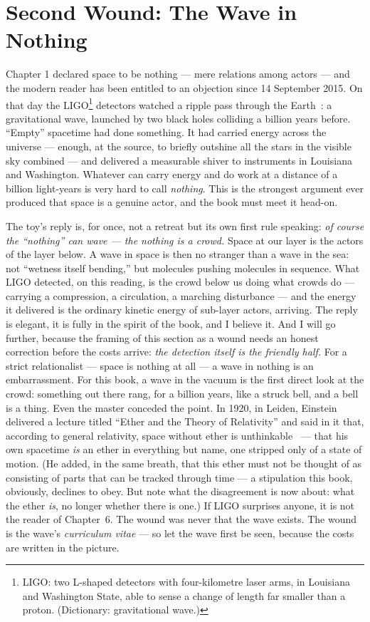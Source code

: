 \documentclass[fontsize=11pt,paper=a4,pagesize=auto,parskip=half-]{scrbook}
\newcommand{\Iy}[1]{#1\index{#1}}
\begin{document}
\section{Second Wound: The Wave in Nothing}

Chapter 1 declared space to be nothing --- mere relations among actors --- and the modern reader has been entitled to an objection since 14 September 2015. On that day the LIGO\footnote{LIGO: two L-shaped detectors with four-kilometre laser arms, in Louisiana and Washington State, able to sense a change of length far smaller than a proton. (Dictionary: gravitational wave.)} detectors watched a ripple pass through the Earth~\cite{ligo2016}: a gravitational wave, launched by two black holes colliding a billion years before. ``Empty'' spacetime had done something. It had carried energy across the universe --- enough, at the source, to briefly outshine all the stars in the visible sky combined --- and delivered a measurable shiver to instruments in Louisiana and Washington. Whatever can carry energy and do work at a distance of a billion light-years is very hard to call \emph{nothing}. This is the strongest argument ever produced that space is a genuine actor, and the book must meet it head-on.

The toy's reply is, for once, not a retreat but its own first rule speaking: \emph{of course the ``nothing'' can wave --- the nothing is a crowd.} Space at our layer is the actors of the layer below. A wave in space is then no stranger than a wave in the sea: not ``wetness itself bending,'' but molecules pushing molecules in sequence. What LIGO detected, on this reading, is the crowd below us doing what crowds do --- carrying a compression, a circulation, a marching disturbance --- and the energy it delivered is the ordinary kinetic energy of sub-layer actors, arriving. The reply is elegant, it is fully in the spirit of the book, and I believe it. And I will go further, because the framing of this section as a wound needs an honest correction before the costs arrive: \emph{the detection itself is the friendly half.} For a strict relationalist --- space is nothing at all --- a wave in nothing is an embarrassment. For this book, a wave in the vacuum is the first direct look at the crowd: something out there rang, for a billion years, like a struck bell, and a bell is a thing. Even the master conceded the point. In 1920, in Leiden, \Iy{Einstein} delivered a lecture titled ``Ether and the Theory of Relativity'' and said in it that, according to general relativity, space without ether is unthinkable~\cite{einstein1920} --- that his own spacetime \emph{is} an ether in everything but name, one stripped only of a state of motion. (He added, in the same breath, that this ether must not be thought of as consisting of parts that can be tracked through time --- a stipulation this book, obviously, declines to obey. But note what the disagreement is now about: what the ether \emph{is}, no longer whether there is one.) If LIGO surprises anyone, it is not the reader of Chapter~6. The wound was never that the wave exists. The wound is the wave's \emph{curriculum vitae} --- so let the wave first be seen, because the costs are written in the picture.
\end{document}
